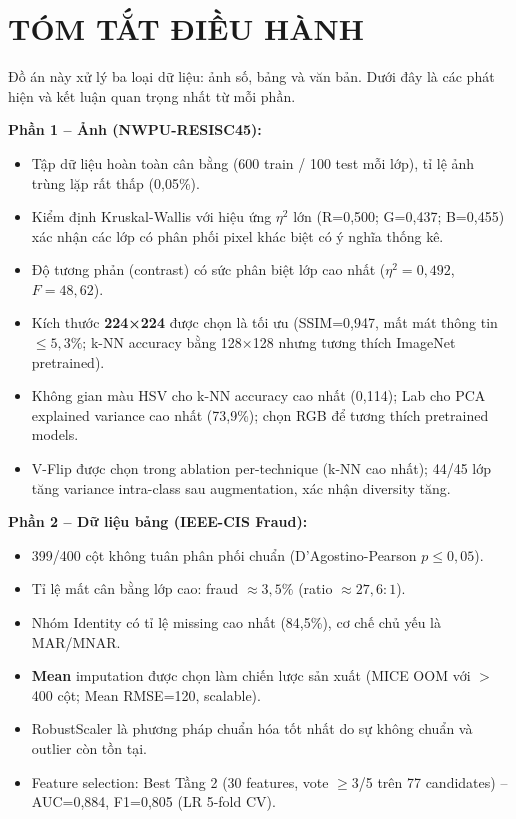 \documentclass[12pt,a4paper]{article}
\let\oldtextbf\textbf
\renewcommand{\textbf}[1]{\oldtextbf{\textcolor{hcmublue}{#1}}}
\begin{document}
\section{TÓM TẮT ĐIỀU HÀNH}

Đồ án này xử lý ba loại dữ liệu: ảnh số, bảng và văn bản. Dưới đây là các phát hiện và kết luận quan trọng nhất từ mỗi phần.

\textbf{Phần 1 -- Ảnh (NWPU-RESISC45):}
\begin{itemize}
    \item Tập dữ liệu hoàn toàn cân bằng (600 train / 100 test mỗi lớp), tỉ lệ ảnh trùng lặp rất thấp (0,05\%).
    \item Kiểm định Kruskal-Wallis với hiệu ứng $\eta^2$ lớn (R=0,500; G=0,437; B=0,455) xác nhận các lớp có phân phối pixel khác biệt có ý nghĩa thống kê.
    \item Độ tương phản (contrast) có sức phân biệt lớp cao nhất ($\eta^2 = 0{,}492$, $F = 48{,}62$).
    \item Kích thước \textbf{224×224} được chọn là tối ưu (SSIM=0{,}947, mất mát thông tin $\leq 5{,}3\%$; k-NN accuracy bằng 128×128 nhưng tương thích ImageNet pretrained).
    \item Không gian màu HSV cho k-NN accuracy cao nhất (0{,}114); Lab cho PCA explained variance cao nhất (73{,}9\%); chọn RGB để tương thích pretrained models.
    \item V-Flip được chọn trong ablation per-technique (k-NN cao nhất); 44/45 lớp tăng variance intra-class sau augmentation, xác nhận diversity tăng.
\end{itemize}

\textbf{Phần 2 -- Dữ liệu bảng (IEEE-CIS Fraud):}
\begin{itemize}
    \item 399/400 cột không tuân phân phối chuẩn (D'Agostino-Pearson $p \leq 0{,}05$).
    \item Tỉ lệ mất cân bằng lớp cao: fraud $\approx 3{,}5\%$ (ratio $\approx 27{,}6:1$).
    \item Nhóm Identity có tỉ lệ missing cao nhất (84,5\%), cơ chế chủ yếu là MAR/MNAR.
    \item \textbf{Mean} imputation được chọn làm chiến lược sản xuất (MICE OOM với $>$400 cột; Mean RMSE=120, scalable).
    \item RobustScaler là phương pháp chuẩn hóa tốt nhất do sự không chuẩn và outlier còn tồn tại.
    \item Feature selection: Best Tầng 2 (30 features, vote $\geq$3/5 trên 77 candidates) -- AUC=0{,}884, F1=0{,}805 (LR 5-fold CV).
\end{itemize}
\end{document}
